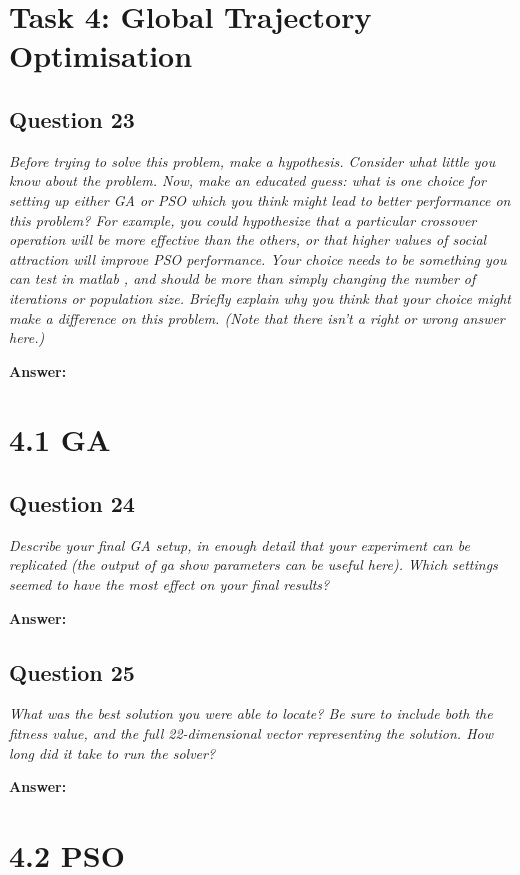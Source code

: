 \documentclass[a4paper]{article}
\begin{document}
\section*{Task 4: Global Trajectory Optimisation}

\subsection*{Question 23}
\emph{Before trying to solve this problem, make a hypothesis. Consider what little you know about the problem. Now, make an educated guess: what is one choice for setting up either GA or PSO which you think might lead to better performance on this problem? For example, you could hypothesize that a particular crossover operation will be more effective than the others, or that higher values of social attraction will improve PSO performance. Your choice needs to be something you can test in matlab , and should be more than simply changing the number of iterations or population size. Briefly explain why you
think that your choice might make a difference on this problem. (Note that there isn’t a right or wrong answer here.)}

\textbf{Answer:}

\section*{4.1 GA}

\subsection*{Question 24}
\emph{Describe your final GA setup, in enough detail that your experiment can be replicated (the output of ga show parameters can be useful here). Which settings seemed to have the most effect on your final results?}

\textbf{Answer:}

\subsection*{Question 25}
\emph{What was the best solution you were able to locate? Be sure to
include both the fitness value, and the full 22-dimensional vector representing
the solution. How long did it take to run the solver?}

\textbf{Answer:}

\section*{4.2 PSO}
\end{document}

